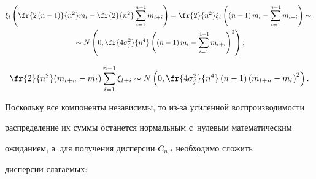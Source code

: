     \vspace*{-12pt}





    \noindent


    \begin{multline*}


        \xi_t\left(\fr{2\left(n-1\right)}{n^2}m_t -


        \fr{2}{n^2}\sum\limits^{n-1}_{i=1}m_{t+i}\right) =


         \fr{2}{n^2}\xi_t\left(\left(n-1\right)m_t - \sum\limits^{n-1}_{i=1}m_{t+i}


         \right) \sim{} \\


         {}\sim N\left(0, \fr{4\sigma_j^2}{n^4}\left(\left(n-1\right)m_t -


         \sum\limits^{n-1}_{i=1}m_{t+i}\right)^2\right);


    \end{multline*}





    \noindent


    \begin{equation*}


        \fr{2}{n^2}(m_{t+n}-m_t)\sum\limits^{n-1}_{i=1}\xi_{t+i}


        \sim N\left(0, \fr{4\sigma_j^2}{n^4}\left(n-1\right)\left(


        m_{t+n}-m_t\right)^2\right).


    \end{equation*}





    Поскольку все компоненты независимы, то из-за усиленной воспроизво\-ди\-мости


    распределение их суммы останется нормальным с~нулевым математическим


    ожиданием, а~для получения дисперсии $C_{n,t}$ необходимо сложить


    дисперсии слагаемых:


